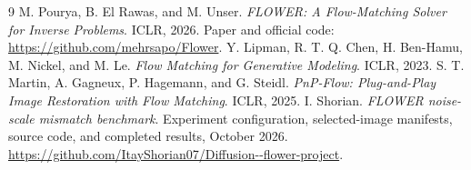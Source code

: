 \documentclass[10pt,letterpaper]{article}
\begin{document}
\begin{thebibliography}{9}
 M. Pourya, B. El Rawas, and M. Unser. \emph{FLOWER: A Flow-Matching Solver for Inverse Problems}. ICLR, 2026. Paper and official code: \url{https://github.com/mehrsapo/Flower}.
 Y. Lipman, R. T. Q. Chen, H. Ben-Hamu, M. Nickel, and M. Le. \emph{Flow Matching for Generative Modeling}. ICLR, 2023.
 S. T. Martin, A. Gagneux, P. Hagemann, and G. Steidl. \emph{PnP-Flow: Plug-and-Play Image Restoration with Flow Matching}. ICLR, 2025.
 I. Shorian. \emph{FLOWER noise-scale mismatch benchmark}. Experiment configuration, selected-image manifests, source code, and completed results, October 2026. \url{https://github.com/ItayShorian07/Diffusion--flower-project}.
\end{thebibliography}
\end{document}
